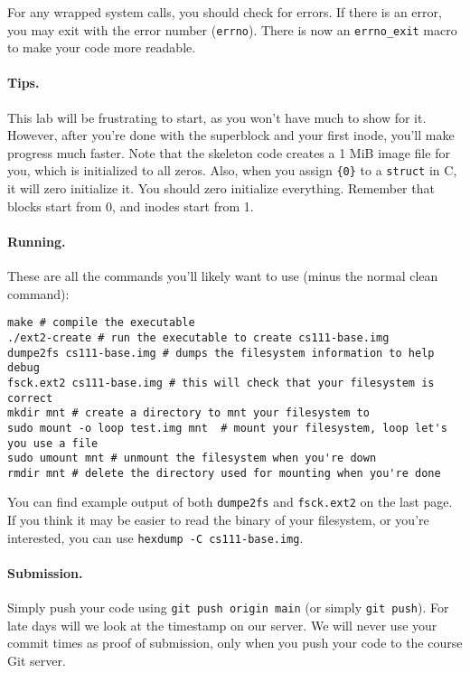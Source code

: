 For any wrapped system calls, you should check for errors.
If there is an error, you may exit with the error number (\texttt{errno}).
There is now an \texttt{errno\_exit} macro to make your code more readable.

\paragraph{Tips.}

This lab will be frustrating to start, as you won't have much to show for it.
However, after you're done with the superblock and your first inode, you'll
make progress much faster.
Note that the skeleton code creates a 1 MiB image file for you, which is
initialized to all zeros.
Also, when you assign \texttt{\{0\}} to a \texttt{struct} in C, it will
zero initialize it.
You should zero initialize everything.
Remember that blocks start from 0, and inodes start from 1.

\paragraph{Running.}

These are all the commands you'll likely want to use (minus the normal
clean command):

\begin{lstlisting}
make # compile the executable
./ext2-create # run the executable to create cs111-base.img
dumpe2fs cs111-base.img # dumps the filesystem information to help debug
fsck.ext2 cs111-base.img # this will check that your filesystem is correct
mkdir mnt # create a directory to mnt your filesystem to
sudo mount -o loop test.img mnt  # mount your filesystem, loop let's you use a file
sudo umount mnt # unmount the filesystem when you're down
rmdir mnt # delete the directory used for mounting when you're done
\end{lstlisting}

You can find example output of both \lstinline|dumpe2fs| and
\lstinline|fsck.ext2| on the last page.
If you think it may be easier to read the binary of your filesystem, or
you're interested, you can use \lstinline|hexdump -C cs111-base.img|.

\paragraph{Submission.}

Simply push your code using \lstinline|git push origin main| (or simply
\lstinline|git push|).
For late days will we look at the timestamp on our server.
We will never use your commit times as proof of submission, only when you
push your code to the course Git server.

